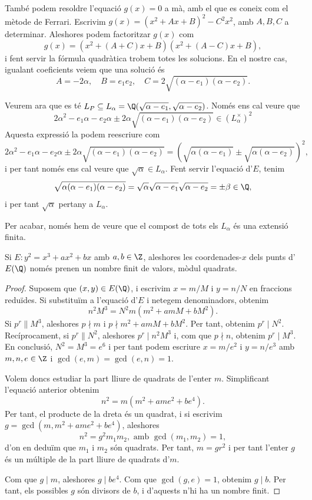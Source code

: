  \begin{remark}
  També podem resoldre l'equació $g(x)=0$ a mà, amb el que es coneix com el mètode de Ferrari. Escrivim ${g(x) = (x^2+Ax+B)^2 - C^2x^2}$, amb $A,B,C$ a determinar. Aleshores podem factoritzar $g(x)$ com
\[
g(x) = (x^2 + (A+C)x + B)(x^2+(A-C)x + B),
\]
i fent servir la fórmula quadràtica trobem totes les solucions. En el nostre cas, igualant coeficients veiem que una solució és
  \[
  A = -2\alpha,\quad B = e_1e_2,\quad
  C =  2\sqrt{(\alpha-e_1)(\alpha-e_2)}.
\]
 \end{remark}
 
 Veurem ara que es té $L_P\subseteq L_\alpha = \Q(\sqrt{\alpha-e_1},\sqrt{\alpha-e_2})$. Només ens cal veure que
 \[
 2\alpha^2-e_1\alpha-e_2\alpha \pm 2\alpha\sqrt{(\alpha-e_1)(\alpha-e_2)} \in (L_\alpha^\times)^2
 \]
 Aquesta expressió la podem reescriure com
 \[
 2\alpha^2-e_1\alpha-e_2\alpha \pm 2\alpha\sqrt{(\alpha-e_1)(\alpha-e_2)}=\left(\sqrt{\alpha(\alpha-e_1)} \pm \sqrt{\alpha(\alpha-e_2)}\right)^2,
 \]
 i per tant només ens cal veure que $\sqrt{\alpha}\in L_\alpha$. Fent servir l'equació d'$E$, tenim
 \[
 \sqrt{\alpha(\alpha-e_1)(\alpha -e_2)}=\sqrt{\alpha}\sqrt{\alpha-e_1}\sqrt{\alpha-e_2}=\pm\beta\in\Q,
 \]
 i per tant $\sqrt{\alpha}$ pertany a $L_\alpha$.

Per acabar, només hem de veure que el compost de tots els $L_\alpha$ és una extensió finita.

\begin{lemma}
 Si $E\colon y^2=x^3+ax^2+bx$ amb $a,b\in\Z$, aleshores les coordenades-$x$ dels punts d'$E(\Q)$ només prenen un nombre finit de valors, mòdul quadrats.
\end{lemma}
\begin{proof}
Suposem que $(x,y)\in E(\Q)$, i escrivim $x=m/M$ i $y=n/N$ en fraccions reduïdes. Si substituïm a l'equació d'$E$ i netegem denominadors, obtenim
\[
n^2M^3=N^2m(m^2+amM+bM^2).
\]
Si $p^r\parallel M^3$, aleshores $p\nmid m$ i $p\nmid m^2+amM+bM^2$. Per tant, obtenim $p^r\mid N^2$. Recíprocament, si $p^r\parallel N^2$, aleshores $p^r\mid n^2M^3$ i, com que $p\nmid n$, obtenim $p^r \mid M^3$. En conclusió, $N^2=M^3=e^6$ i per tant podem escriure $x=m/e^2$ i $y=n/e^3$ amb $m,n,e\in \Z$ i $\gcd(e,m)=\gcd(e,n)=1$.

Volem doncs estudiar la part lliure de quadrats de l'enter $m$. Simplificant l'equació anterior obtenim
 \[
 n^2=m(m^2+ame^2+be^4).
 \]
 Per tant, el producte de la dreta és un quadrat, i si escrivim $g=\gcd(m,m^2+ame^2+be^4)$, aleshores
 \[
 n^2 = g^2 m_1 m_2,\text{ amb } \gcd(m_1,m_2)=1,
 \]
 d'on en deduïm que $m_1$ i $m_2$ són quadrats. Per tant, $m=gr^2$ i per tant l'enter $g$ és un múltiple  de la part lliure de quadrats d'$m$.
 
 Com que $g\mid m$, aleshores $g\mid be^4$. Com que $\gcd(g,e)=1$, obtenim $g\mid b$. Per tant, els possibles $g$ són divisors de $b$, i d'aquests n'hi ha un nombre finit.
\end{proof}

